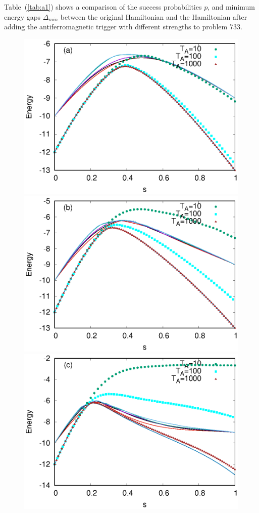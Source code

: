 \documentclass[../main.tex]{subfiles}
\begin{document}
Table~(\ref{tab:a1}) shows a comparison of the success probabilities $p$, and minimum energy gaps $\Delta_{min}$ between the original Hamiltonian and the Hamiltonian after adding the antiferromagnetic trigger with different strengths to problem 733.
\begin{figure}
\centering 
\includegraphics[scale=0.8]{733_s12_A_g0.eps}
\includegraphics[scale=0.8]{733_s12_A_g1.eps}
\includegraphics[scale=0.8]{733_s12_A_g2.eps}

\end{figure}
\end{document}
